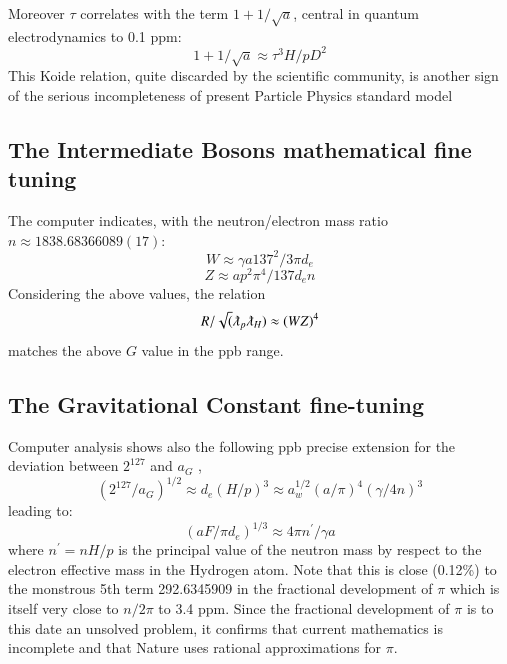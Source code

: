 \documentclass[twoside,draft]{article}
\begin{document}
\begin{sloppypar}
{Moreover $\tau$ correlates with the
term $1+1/\sqrt{a}$, central in quantum electrodynamics to 0.1 ppm:
\begin{equation}
1+1/\sqrt{a} \approx \tau^{3} H/pD^{2}
\end{equation}
This Koide relation, quite discarded by the scientific community, is another sign of the serious incompleteness of present Particle Physics standard model

\subsection {The Intermediate Bosons mathematical fine tuning}

The computer indicates, with the neutron/electron mass ratio $n \approx 1838.68366089(17)$:
\begin{equation}
W \approx \gamma a 137^{2} / 3\pi d_{e}
\end{equation}
\begin{equation}
Z \approx ap^{2} \pi^{4} / 137 d_{e} n
\end{equation}
Considering the above values, the relation
\begin{equation}
R/\sqrt(\lambdabar_{p} \lambdabar_{H} ) \approx (WZ)^{4}
\end{equation}
matches the above $G$ value in the ppb range.

\subsection {The Gravitational Constant fine-tuning}

Computer analysis shows also the following ppb precise extension for the deviation between $2^{127}$ and
$a_{G}$ ,
\begin{equation}
(2^{127} / a_{G})^{1/2} \approx d_{e} (H/p)^{3} \approx a_{w}^{1/2} (a/\pi)^{4} ( \gamma/4n)^{3}
\end{equation}
leading to:
\begin{equation}
(aF /\pi d_{e})^{1/3} \approx 4\pi n^{\prime}/ \gamma a
\end{equation}
where $n^{\prime} = nH/p$ is the principal value of the neutron mass by respect to the electron effective mass
in the Hydrogen atom. Note that this is close (0.12\%) to the monstrous 5th term 292.6345909 in
the fractional development of $\pi$ which is itself very close to $n/2\pi$ to 3.4 ppm. Since the fractional
development of $\pi$ is to this date an unsolved problem, it confirms that current mathematics is
incomplete and that Nature uses rational approximations for $\pi$.

}
\end{sloppypar}
\end{document}
